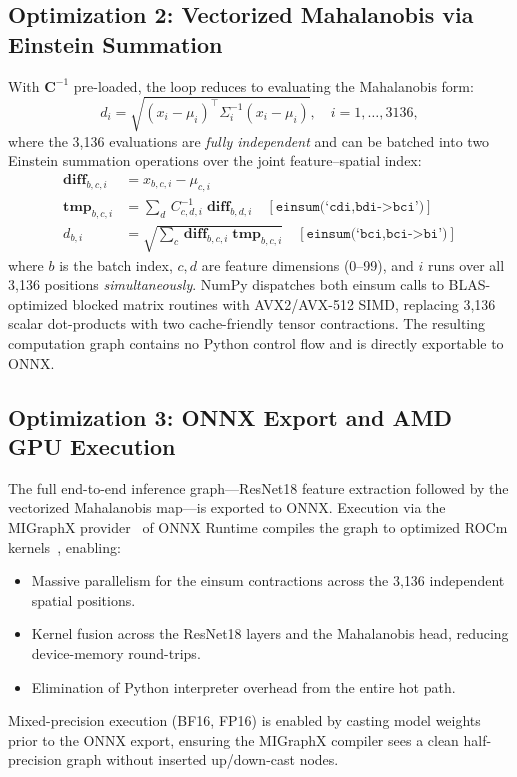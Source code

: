 \documentclass[blind]{gtac}
\begin{document}
\subsection{Optimization 2: Vectorized Mahalanobis via Einstein Summation}

With $\mathbf{C}^{-1}$ pre-loaded, the loop reduces to evaluating the
Mahalanobis form:
%
\begin{equation}
  d_i = \sqrt{(x_i - \mu_i)^\top \Sigma_i^{-1} (x_i - \mu_i)}, \quad i=1,\ldots,3136,
\end{equation}
%
where the 3{,}136 evaluations are \emph{fully independent} and can be batched
into two Einstein summation operations over the joint feature--spatial index:
%
\begin{align}
  \mathbf{diff}_{b,c,i} &= x_{b,c,i} - \mu_{c,i} \label{eq:diff}\\
  \mathbf{tmp}_{b,c,i}  &= \sum_{d}\, C^{-1}_{c,d,i}\;\mathbf{diff}_{b,d,i}
    \quad [\texttt{einsum(`cdi,bdi->bci')}] \label{eq:tmp}\\
  d_{b,i}               &= \sqrt{\sum_{c}\, \mathbf{diff}_{b,c,i}\;\mathbf{tmp}_{b,c,i}}
    \quad [\texttt{einsum(`bci,bci->bi')}] \label{eq:dist}
\end{align}
%
where $b$ is the batch index, $c,d$ are feature dimensions (0--99), and $i$
runs over all 3{,}136 positions \emph{simultaneously}.  NumPy dispatches both
einsum calls to BLAS-optimized blocked matrix routines with AVX2/AVX-512 SIMD,
replacing 3{,}136 scalar dot-products with two cache-friendly tensor
contractions.  The resulting computation graph contains no Python control flow
and is directly exportable to ONNX.

\subsection{Optimization 3: ONNX Export and AMD GPU Execution}

The full end-to-end inference graph---ResNet18 feature extraction followed by
the vectorized Mahalanobis map---is exported to ONNX.  Execution via the
MIGraphX provider~\cite{migraphx} of ONNX Runtime compiles the graph to
optimized ROCm kernels~\cite{rocm}, enabling:
%
\begin{itemize}
  \item Massive parallelism for the einsum contractions across the 3{,}136
    independent spatial positions.
  \item Kernel fusion across the ResNet18 layers and the Mahalanobis head,
    reducing device-memory round-trips.
  \item Elimination of Python interpreter overhead from the entire hot path.
\end{itemize}
%
Mixed-precision execution (BF16, FP16) is enabled by casting model weights
prior to the ONNX export, ensuring the MIGraphX compiler sees a clean
half-precision graph without inserted up/down-cast nodes.
\end{document}
